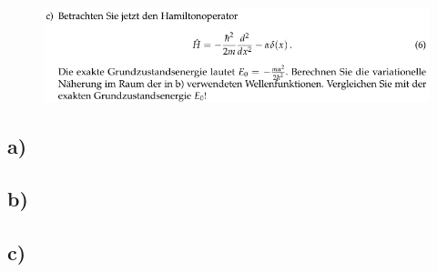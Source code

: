     \begin{figure}[H]
        \centering
        \includegraphics[width=\textwidth]{images/Aufgabe4b.jpg}
        \label{fig:6}
    \end{figure}

\subsection{a)}

\subsection{b)}

\subsection{c)}

